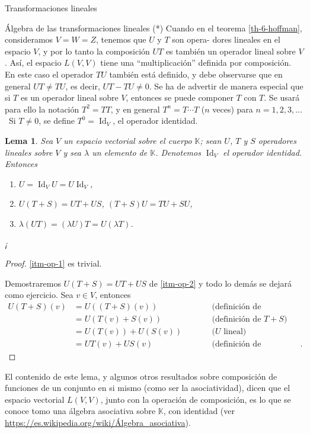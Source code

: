 \documentclass[a4paper,12pt,twoside,spanish,reqno]{amsbook}
\numberwithin{equation}{section}
\newtheorem{lema}[teorema]{Lema}
\theoremstyle{definition}
\theoremstyle{remark}
\newcommand{\Id}{\operatorname{Id}}
\newcommand{\K}{\mathbb K}
\begin{document}
\begin{chapter}{Transformaciones lineales}
\begin{section}{Álgebra de las transformaciones lineales (*)}
        Cuando  en el teorema \ref{th-6-hoffman}, consideramos $V = W = Z$, tenemos que $U$ y $T$ son opera-
        dores lineales en el espacio $V$, y por lo tanto la composición $UT$ es también un operador lineal sobre $V$. Así, el espacio $L(V, V)$ tiene una ``multiplicación'' definida por composición. En este caso el operador $TU$ también está definido, y debe observarse que en general $UT \not= TU$, es decir, $UT - TU \not= 0$. Se ha de advertir de manera especial que si $T$ es un operador lineal sobre $V$, entonces se puede componer $T$ con $T$. Se usará para ello la notación $T^2 = TT$, y en general $T^n = T \cdots T$ ($n$ veces) para $n = 1, 2, 3, \ldots$\,  Si $T \ne 0$, se define $T^0 = \Id_V$, el operador identidad.
            
        \begin{lema}
            Sea $V$ un espacio vectorial sobre el cuerpo $\K$; sean $U$, $T$ y $S$ operadores lineales sobre $V$ y sea $\lambda$ un elemento de $\K$. Denotemos $\Id_V$ el operador identidad. Entonces
            \begin{enumerate}
                \item\label{itm-op-1} $U = \Id_VU = U\Id_V$,
                \item\label{itm-op-2} $U(T+S) = UT + US$, $(T+S)U = TU + SU$,
                \item\label{itm-op-3} $\lambda (UT) = (\lambda U)T = U (\lambda T)$.
            \end{enumerate}¡
        \end{lema}
        \begin{proof}
            \ref{itm-op-1} es trivial. 
            
            Demostraremos $U(T+S) = UT + US$ de \ref{itm-op-2} y todo lo demás se dejará como ejercicio.
            Sea $ v \in V$, entonces
            \begin{align*}
            U(T+S)(v) &= U((T+S)(v))&\qquad&\text{(definición de composición)} \\
            &= U(T(v)+S(v))&\qquad&\text{(definición  de $T+S$)} \\
            &= U(T(v))+U(S(v))&\qquad&\text{($U$ lineal)} \\
            &= UT(v)+US(v)&\qquad&\text{(definición de composición)}.
            \end{align*}  
        \end{proof}	
    
    El contenido de este lema, y algunos otros resultados  sobre composición de funciones de un conjunto en si mismo (como ser la asociatividad), dicen que el espacio vectorial $L(V, V)$, junto con la operación de composición, es lo que se conoce tomo una  álgebra asociativa sobre $\K$,  con identidad (ver \href{https://es.wikipedia.org/wiki/Álgebra\_asociativa}{https://es.wikipedia.org/wiki/Álgebra\_asociativa}). 
    

\end{section}
\end{chapter}
\end{document}
